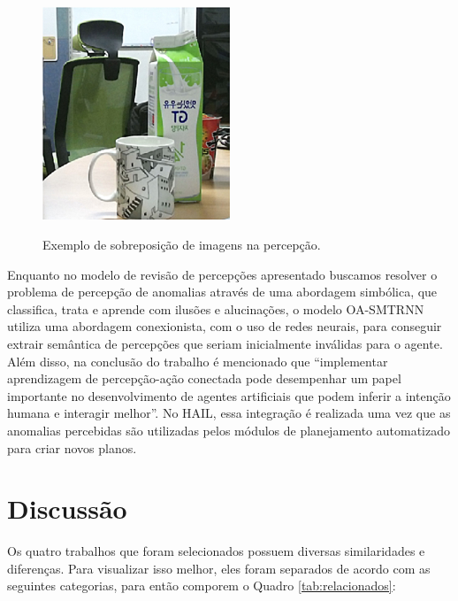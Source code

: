 \begin{figure}[h!]
    \centering
    \caption{Exemplo de sobreposição de imagens na percepção.}
    \includegraphics[width=0.5\textwidth]{images/overlap.jpg}
    \label{fig:overlap}
\end{figure}

Enquanto no modelo de revisão de percepções apresentado buscamos resolver o problema de percepção de anomalias através de uma abordagem simbólica, que classifica, trata e aprende com ilusões e alucinações, o modelo OA-SMTRNN utiliza uma abordagem conexionista, com o uso de redes neurais, para conseguir extrair semântica de percepções que seriam inicialmente inválidas para o agente. Além disso, na conclusão do trabalho é mencionado que “implementar aprendizagem de percepção-ação conectada pode desempenhar um papel importante no desenvolvimento de agentes artificiais que podem inferir a intenção humana e interagir melhor”. No HAIL, essa integração é realizada uma vez que as anomalias percebidas são utilizadas pelos módulos de planejamento automatizado para criar novos planos.

\section{Discussão}

Os quatro trabalhos que foram selecionados possuem diversas similaridades e diferenças. Para visualizar isso melhor, eles foram separados de acordo com as seguintes categorias, para então comporem o Quadro \ref{tab:relacionados}:

